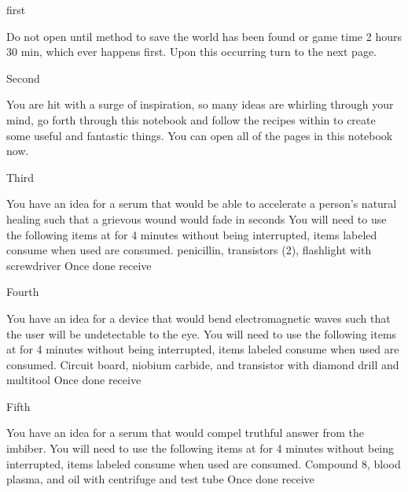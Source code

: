 \documentclass[greennotebook]{guildcamp3} %
\begin{document}
\startnotebook{\nSciOneRecipes{}}

\begin{page}{first}
	
	Do not open until method to save the world has been found or game time 2 hours 30 min, which ever happens first. Upon this occurring turn to the next page.
	
\end{page}

\begin{page}{Second}
	
	You are hit with a surge of inspiration, so many ideas are whirling through your mind, go forth through this notebook and follow the recipes within to create some useful and fantastic things. You can open all of the pages in this notebook now.
	
\end{page}

\begin{page}{Third}
	
	You have an idea for a serum that would be able to accelerate a person's natural healing such that a grievous wound would fade in seconds
	You will need to use the following items at \sSciWorkbench{} for 4 minutes without being interrupted, items labeled consume when used are consumed.
	penicillin, transistors (2), flashlight with screwdriver
	Once done receive \iHealthRemedy{}
	
\end{page}

\begin{page}{Fourth}
	
	You have an idea for a device that would bend electromagnetic waves such that the user will be undetectable to the eye.
	You will need to use the following items at \sSciWorkbench{} for 4 minutes without being interrupted, items labeled consume when used are consumed.
	Circuit board, niobium carbide, and transistor with diamond drill and multitool
	Once done receive \iCloakingDevice{}
	
\end{page}

\begin{page}{Fifth}
	
	You have an idea for a serum that would compel truthful answer from the imbiber.
	You will need to use the following items at \sSciWorkbench{} for 4 minutes without being interrupted, items labeled consume when used are consumed.
	Compound 8, blood plasma, and oil with centrifuge and test tube
	Once done receive \iTruthSerum{}
	
\end{page}
\end{document}
